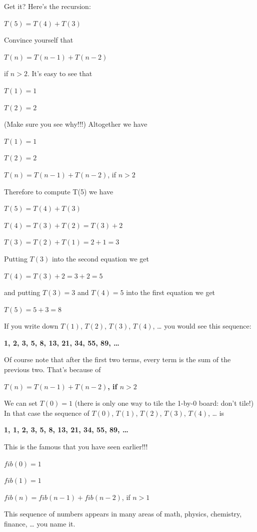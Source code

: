 Get it? Here's the recursion:

$T(5) = T(4) + T(3)$

Convince yourself that

$T(n) = T(n - 1) + T(n - 2)$

if $n > 2$. It's easy to see that

$T(1) = 1$

$T(2) = 2$

(Make sure you see why!!!) Altogether we have

$T(1) = 1$

$T(2) = 2$

$T(n) = T(n - 1) + T(n - 2)$, if $n > 2$

Therefore to compute T(5) we have

$T(5) = T(4) + T(3)$

$T(4) = T(3) + T(2) = T(3) + 2$

$T(3) = T(2) + T(1) = 2 + 1 = 3$

Putting $T(3)$ into the second equation we get

$T(4) = T(3) + 2 = 3 + 2 = 5$

and putting $T(3) = 3$ and $T(4) = 5$ into the first equation we get

$T(5) = 5 + 3 = 8$



If you write down $T(1)$, $T(2)$, $T(3)$, $T(4)$, \ldots{} you would see this sequence:

\textbf{1, 2, 3, 5, 8, 13, 21, 34, 55, 89, \ldots{}}

Of course note that after the first two terms, every term is the sum of
the previous two. That's because of

\textbf{$T(n) = T(n - 1) + T(n - 2)$, if $n > 2$}

We can set $T(0) = 1$ (there is only one way to tile the 1-by-0 board: don't tile!) In that case the sequence of $T(0)$, $T(1)$, $T(2)$, $T(3)$, $T(4)$, \ldots{} is

\textbf{1, 1, 2, 3, 5, 8, 13, 21, 34, 55, 89, \ldots{}}

This is the famous  that you have seen
earlier!!!

$fib(0) = 1$

$fib(1) = 1$

$fib(n) = fib(n - 1) + fib(n - 2)$, if $n > 1$

This sequence of numbers appears in many areas of math, physics, chemistry, finance, \ldots{} you name it.

